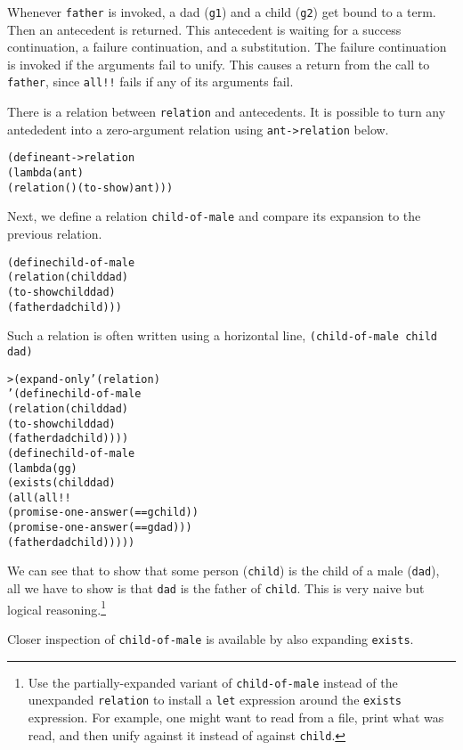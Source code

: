 Whenever \texttt{father} is invoked, a dad (\texttt{g1}) and a child
(\texttt{g2}) get bound to a term.  Then an antecedent is returned.
This antecedent is waiting for a success continuation, a failure
continuation, and a substitution.  The failure continuation is invoked
if the arguments fail to unify.  This causes a return from the call
to \texttt{father}, since \texttt{all!!} fails if any of its arguments
fail.

There is a relation between \texttt{relation} and antecedents.
It is possible to turn any antededent into a zero-argument
relation using \texttt{ant->relation} below.

\begin{alltt}
(define ant->relation
  (lambda (ant)
    (relation () (to-show) ant)))
\end{alltt}

Next, we define a relation \texttt{child-of-male} and compare its expansion
to the previous relation.

\begin{alltt}
(define child-of-male
  (relation (child dad)
    (to-show child dad)
    (father dad child)))
\end{alltt}

Such a relation is often written using a horizontal line,
 {\texttt{(child-of-male child dad)}}{}

\begin{alltt}
> (expand-only '(relation)
    '(define child-of-male
       (relation (child dad)
         (to-show child dad)
         (father dad child))))
(define child-of-male
  (lambda (g g)
    (exists (child dad)
      (all (all!!
             (promise-one-answer (== g child))
             (promise-one-answer (== g dad)))
           (father dad child)))))
\end{alltt}

We can see that to show that some person (\texttt{child}) is the child
of a male (\texttt{dad}), all we have to show is that \texttt{dad} is the
father of \texttt{child}.  This is very naive but logical
reasoning.\footnote{Use the partially-expanded variant of
\texttt{child-of-male} instead of the unexpanded \texttt{relation} to
install a \texttt{let} expression around the \texttt{exists}
expression.  For example, one might want to read from a file, print
what was read, and then unify against it instead of against
\texttt{child}.}

Closer inspection of \texttt{child-of-male} is available by also
expanding \texttt{exists}.

